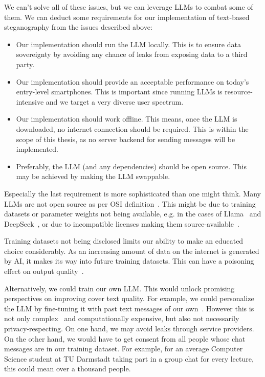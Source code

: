 We can't solve all of these issues, but we can leverage \glspl{LLM} to combat some of them. We can deduct some requirements for our implementation of text-based steganography from the issues described above:
\begin{itemize}
    \item Our implementation should run the \gls{LLM} locally. This is to ensure data sovereignty by avoiding any chance of leaks from exposing data to a third party.
    \item Our implementation should provide an acceptable performance on today's entry-level smartphones. This is important since running \glspl{LLM} is resource-intensive and we target a very diverse user spectrum.
    \item Our implementation should work offline. This means, once the \gls{LLM} is downloaded, no internet connection should be required. This is within the scope of this thesis, as no server backend for sending messages will be implemented.
    \item Preferably, the \gls{LLM} (and any dependencies) should be open source. This may be achieved by making the \gls{LLM} swappable.
\end{itemize}

Especially the last requirement is more sophisticated than one might think. Many \glspl{LLM} are not open source as per \gls{OSI} definition~\cite{tarkowskiDataGovernanceOpen2025,osiOpenSourceAI,gnuprojectWhatFreeSoftware}. This might be due to training datasets or parameter weights not being available, e.g. in the cases of Llama~\cite{metaMetallamaLlamamodels2025,touvronLLaMAOpenEfficient2023} and DeepSeek~\cite{deepseekDeepseekaiDeepSeekR12025,deepseek-aiDeepSeekR1IncentivizingReasoning2025}, or due to incompatible licenses making them source-available~\cite{liesenfeldOpeningChatGPTTracking2023,whiteModelOpennessFramework2024}.

Training datasets not being disclosed limits our ability to make an educated choice considerably. As an increasing amount of data on the internet is generated by \gls{AI}, it makes its way into future training datasets. This can have a poisoning effect on output quality~\cite{alemohammadSelfConsumingGenerativeModels2023,shumailovCurseRecursionTraining2024,martinezUnderstandingInterplayGenerative2023,martinezCombiningGenerativeArtificial2023}.

Alternatively, we could train our own \gls{LLM}. This would unlock promising perspectives on improving cover text quality. For example, we could personalize the \gls{LLM} by fine-tuning it with past text messages of our own~\cite{donnerSimulationMeFinetuning2024,donnerStepStepGuide2024,donnerFinetuningLLMYour2024,donnerFinetuningLLMYour2024a,donnerFinetuningLLMYour2024b}. However this is not only complex~\cite{huLoRALowRankAdaptation2021} and computationally expensive, but also not necessarily privacy-respecting. On one hand, we may avoid leaks through service providers. On the other hand, we would have to get consent from all people whose chat messages are in our training dataset. For example, for an average Computer Science student at TU Darmstadt taking part in a group chat for every lecture, this could mean over a thousand people.
